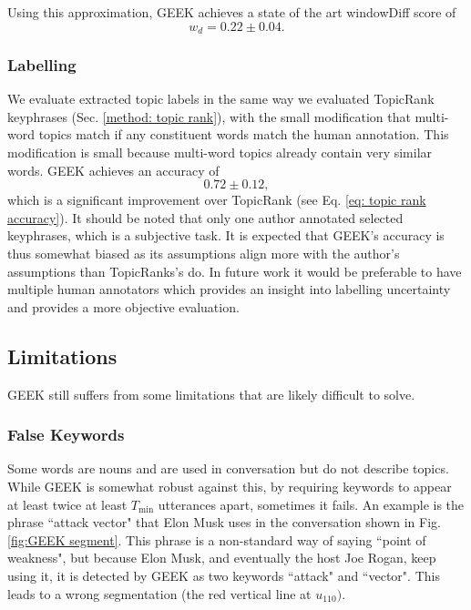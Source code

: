         Using this approximation, GEEK achieves a state of the art windowDiff score of
        \begin{equation}
            w_d = 0.22 \pm 0.04.
        \end{equation}
    
    
    \subsubsection{Labelling}
        We evaluate extracted topic labels in the same way we evaluated TopicRank keyphrases (Sec. \ref{method: topic rank}), with the small modification that multi-word topics match if any constituent words match the human annotation. This modification is small because multi-word topics already contain very similar words. GEEK achieves an accuracy of 
        \begin{equation}
            0.72 \pm 0.12,
        \end{equation}
        which is a significant improvement over TopicRank (see Eq. \ref{eq: topic rank accuracy}). It should be noted that only one author annotated selected keyphrases, which is a subjective task. It is expected that GEEK's accuracy is thus somewhat biased as its assumptions align more with the author's assumptions than TopicRanks's do. In future work it would be preferable to have multiple human annotators which provides an insight into labelling uncertainty and provides a more objective evaluation.
    
    \subsection{Limitations}
    GEEK still suffers from some limitations that are likely difficult to solve.
    
    \subsubsection{False Keywords}
        Some words are nouns and are used in conversation but do not describe topics. While GEEK is somewhat robust against this, by requiring keywords to appear at least twice at least $T_{\text{min}}$ utterances apart, sometimes it fails. An example is the phrase ``attack vector" that Elon Musk uses in the conversation shown in Fig. \ref{fig:GEEK segment}. This phrase is a non-standard way of saying ``point of weakness", but because Elon Musk, and eventually the host Joe Rogan, keep using it, it is detected by GEEK as two keywords ``attack" and ``vector". This leads to a wrong segmentation (the red vertical line at $u_{110})$.
    
